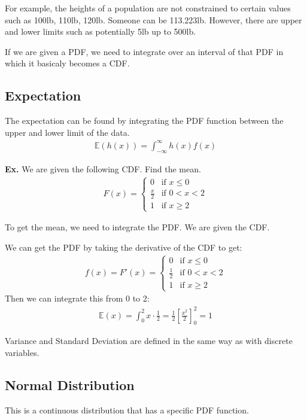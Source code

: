 \documentclass[12pt,letterpaper]{article} \usepackage{amsmath} \usepackage{graphicx} \usepackage[margin=1in]{geometry} \usepackage{longtable}  \usepackage{amssymb}
\begin{document}
	For example, the heights of a population are not constrained to certain values such as 100lb, 110lb, 120lb. Someone can be 113.223lb. However, there are upper and lower limits such as potentially 5lb up to 500lb.
	
	If we are given a PDF, we need to integrate over an interval of that PDF in which it basicaly becomes a CDF. 
	
	\subsection{Expectation}
	The expectation can be found by integrating the PDF function between the upper and lower limit of the data. 
	\begin{align*}
		\mathbb E(h(x)) = \int_{-\infty}^{\infty}h(x)f(x)
	\end{align*}

	\begin{mdframed}
		\textbf{Ex. }We are given the following CDF. Find the mean.
		\begin{align*}
			F(x) = \begin{cases}
				0 & \text{if } x \leq 0 \\
				\frac{x}{2} & \text{if } 0 < x < 2 \\
				1 & \text{if } x \geq 2
			\end{cases}
		\end{align*}
	
		To get the mean, we need to integrate the PDF. We are given the CDF. 
		
		We can get the PDF by taking the derivative of the CDF to get:
		\begin{align*}
			f(x) = F\prime (x) = \begin{cases}
				0 & \text{if } x \leq 0 \\
				\frac{1}{2} & \text{if } 0 < x < 2 \\
				1 & \text{if } x \geq 2
			\end{cases}
		\end{align*}
		Then we can integrate this from 0 to 2:
		\begin{align*}
			\mathbb E(x) = \int_0^2 x \cdot \frac{1}{2} = \frac{1}{2}\left[\frac{x^2}{2}\right]^2_0 = 1
		\end{align*}
	\end{mdframed}

	Variance and Standard Deviation are defined in the same way as with discrete variables. 
	
	\subsection{Normal Distribution}
	This is a continuous distribution that has a specific PDF function.
	
\end{document}
